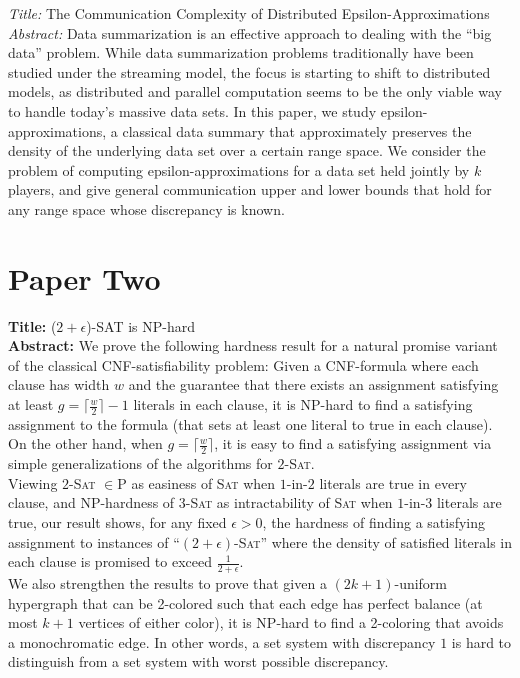 \documentclass[11pt]{article}
\begin{document}
\textit{Title:} The Communication Complexity of Distributed Epsilon-Approximations\\

\textit{Abstract:} Data summarization is an effective approach to dealing with the ``big data'' problem.
While data summarization problems traditionally have been studied under the streaming
model, the focus is starting to shift to distributed models, as distributed and parallel
computation seems to be the only viable way to handle today's massive data sets. In
this paper, we study epsilon-approximations, a classical data summary that approximately preserves the density of the underlying data set over a certain range space. We consider the problem of computing
epsilon-approximations for a data set held jointly by $k$ players, and give
general communication upper and lower bounds that hold for any range space whose
discrepancy is known.\\

\section*{Paper Two}

\textbf{Title:} ($2+\epsilon$)-SAT is NP-hard\\

\textbf{Abstract:} We prove the following hardness result for a natural promise variant of the classical CNF-satisfiability problem: Given a CNF-formula where each clause has width $w$ and the guarantee that there exists an assignment satisfying at least $g = \lceil \frac{w}{2}\rceil -1$ literals in each clause, it is NP-hard to find a satisfying assignment to the formula (that sets at least one literal to true in each clause). On the other hand, when $g = \lceil \frac{w}{2}\rceil$, it is easy to find a satisfying assignment via simple generalizations of the algorithms for \textsc{$2$-Sat}.\\

Viewing \textsc{$2$-Sat} $\in \mathrm{P}$ as easiness of \textsc{Sat} when $1$-in-$2$ literals are true in every clause, and NP-hardness of \textsc{$3$-Sat} as intractability of \textsc{Sat} when $1$-in-$3$ literals are true, our result shows, for any fixed $\epsilon > 0$, the hardness of finding a satisfying assignment to instances of ``\textsc{$(2+\epsilon)$-Sat}'' where the density of satisfied literals in each clause is promised to exceed $\frac{1}{2+\epsilon}$.\\

We also strengthen the results to prove that given a $(2k+1)$-uniform hypergraph that can be 2-colored such that each edge has perfect balance (at most $k+1$ vertices of either color), it is NP-hard to find a 2-coloring that avoids a monochromatic edge. In other words, a set system with discrepancy $1$ is hard to distinguish from a set system with worst possible discrepancy.\\
\end{document}
